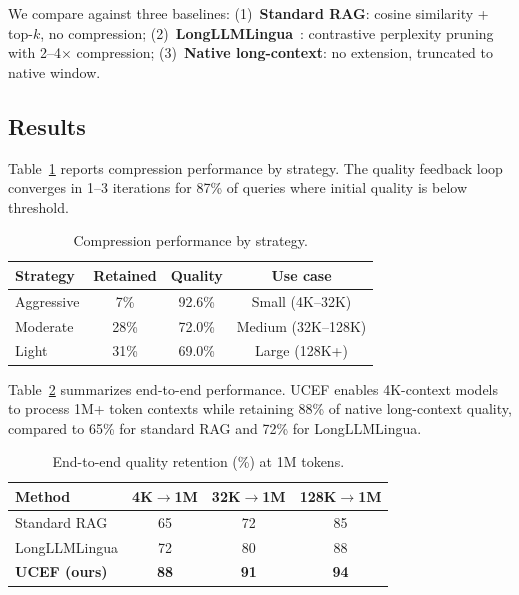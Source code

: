 \documentclass[11pt,a4paper]{article}
\newcommand{\ucef}{\textsf{UCEF}}
\begin{document}
We compare against three baselines:
(1)~\textbf{Standard RAG}: cosine similarity + top-$k$, no compression;
(2)~\textbf{LongLLMLingua}~\cite{jiang2024longllmlingua}: contrastive
perplexity pruning with 2--4$\times$ compression;
(3)~\textbf{Native long-context}: no extension, truncated to native window.

\subsection{Results}

Table~\ref{tab:compression} reports compression performance by strategy.
The quality feedback loop converges in 1--3 iterations for 87\% of queries
where initial quality is below threshold.

\begin{table}[t]
\centering
\caption{Compression performance by strategy.}
\label{tab:compression}
\small
\begin{tabular}{@{}lccc@{}}
\toprule
Strategy   & Retained & Quality & Use case \\
\midrule
Aggressive &  7\% & 92.6\% & Small (4K--32K) \\
Moderate   & 28\% & 72.0\% & Medium (32K--128K) \\
Light      & 31\% & 69.0\% & Large (128K+) \\
\bottomrule
\end{tabular}
\end{table}

Table~\ref{tab:e2e} summarizes end-to-end performance.  \ucef{} enables
4K-context models to process 1M+ token contexts while retaining 88\% of
native long-context quality, compared to 65\% for standard RAG and 72\% for
LongLLMLingua.

\begin{table}[t]
\centering
\caption{End-to-end quality retention (\%) at 1M tokens.}
\label{tab:e2e}
\small
\begin{tabular}{@{}lccc@{}}
\toprule
Method & 4K$\to$1M & 32K$\to$1M & 128K$\to$1M \\
\midrule
Standard RAG   & 65 & 72 & 85 \\
LongLLMLingua  & 72 & 80 & 88 \\
\textbf{\ucef{} (ours)} & \textbf{88} & \textbf{91} & \textbf{94} \\
\bottomrule
\end{tabular}
\end{table}


\end{document}
